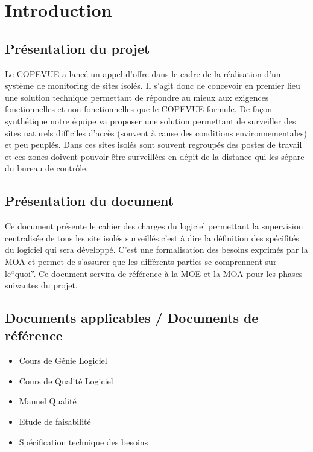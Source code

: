\section{Introduction}
\subsection{Présentation du projet}
Le COPEVUE a lancé un appel d'offre dans le cadre de la réalisation d'un système de monitoring de sites isolés. Il s'agit donc de concevoir en premier lieu une solution technique permettant de répondre au mieux aux exigences fonctionnelles et non fonctionnelles que le COPEVUE formule. De façon synthétique notre équipe va proposer une solution permettant de surveiller des sites naturels difficiles d'accès (souvent à cause des conditions environnementales) et peu peuplés. Dans ces sites isolés sont souvent regroupés des postes de travail et ces zones doivent pouvoir être surveillées en dépit de la distance qui les sépare du bureau de contrôle.

\subsection{Présentation du document}
Ce document présente le cahier des charges du logiciel permettant la supervision centralisée de tous les site isolés surveillés,c'est à dire la définition des spécifités du logiciel qui sera développé. C'est une formalisation des besoins exprimés par la MOA et permet de s'assurer que les différents parties se comprennent sur le``quoi''. Ce document servira de référence à la MOE et la MOA pour les phases suivantes du projet.

\subsection{Documents applicables / Documents de référence}
\begin{itemize}
	\item Cours de Génie Logiciel
	\item Cours de Qualité Logiciel
	\item Manuel Qualité 
	\item Etude de faisabilité
	\item Spécification technique des besoins
\end{itemize}

